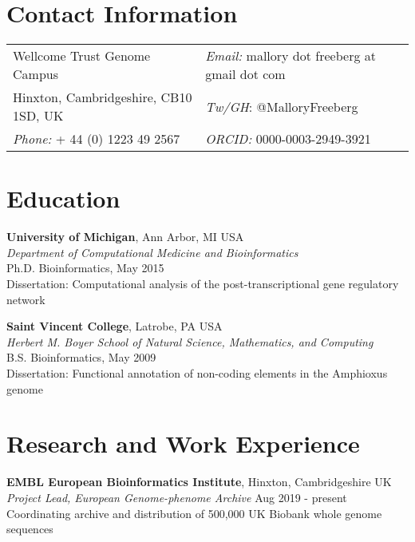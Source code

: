 \documentclass[margin,line]{res}
\begin{document}

\begin{resume}
\section{\sc Contact Information}
\begin{tabular}{@{}p{2.5in}p{5in}}
Wellcome Trust Genome Campus & {\it Email:}  mallory dot freeberg at gmail dot com \\
Hinxton, Cambridgeshire, CB10 1SD, UK & {\it Tw/GH}: @MalloryFreeberg \\
{\it Phone:}  + 44 (0) 1223 49 2567 &  {\it ORCID:} 0000-0003-2949-3921
\end{tabular}


\section{\sc Education}
{\bf University of Michigan}, Ann Arbor, MI USA\\
{\em Department of Computational Medicine and Bioinformatics}\\ 
{Ph.D. Bioinformatics, May 2015}\\
Dissertation: Computational analysis of the post-transcriptional gene regulatory network

{\bf Saint Vincent College}, Latrobe, PA USA\\
{\em Herbert M. Boyer School of Natural Science, Mathematics, and Computing} \\
{B.S. Bioinformatics,  May 2009}\\
Dissertation: Functional annotation of non-coding elements in the Amphioxus genome\\


\section{\sc Research and Work Experience}
{\bf EMBL European Bioinformatics Institute}, Hinxton, Cambridgeshire UK\\
{\em Project Lead, European Genome-phenome Archive} \hfill {Aug 2019 - present}\\
Coordinating archive and distribution of 500,000 UK Biobank whole genome sequences


\end{resume}
\end{document}
